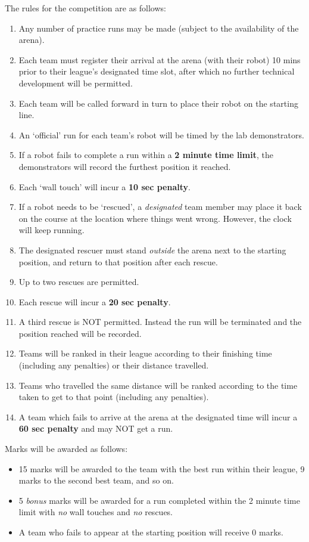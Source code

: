 \documentclass[hidelinks,a4paper,11pt]{article}
\begin{document}
The rules for the competition are as follows:
\begin{enumerate}
	\item Any number of practice runs may be made (subject to the availability of the arena).
	\item Each team must register their arrival at the arena (with their robot) 10 mins prior to their league's designated time slot, after which no further technical development will be permitted.
	\item Each team will be called forward in turn to place their robot on the starting line.
	\item An `official' run for each team's robot will be timed by the lab demonstrators.
	\item If a robot fails to complete a run within a \textbf{2 minute time limit}, the demonstrators will record the furthest position it reached.
	\item Each `wall touch' will incur a \textbf{10 sec penalty}.
	\item If a robot needs to be `rescued', a \emph{designated} team member may place it back on the course at the location where things went wrong.  However, the clock will keep running.
	\item The designated rescuer must stand \emph{outside} the arena next to the starting position, and return to that position after each rescue.
	\item Up to two rescues are permitted.
	\item Each rescue will incur a \textbf{20 sec penalty}.
	\item A third rescue is NOT permitted.  Instead the run will be terminated and the position reached will be recorded.
	\item Teams will be ranked in their league according to their finishing time (including any penalties) or their distance travelled.
	\item Teams who travelled the same distance will be ranked according to the time taken to get to that point (including any penalties).
	\item A team which fails to arrive at the arena at the designated time will incur a \textbf{60 sec penalty} and may NOT get a run.
\end{enumerate}
	
Marks will be awarded as follows:
\begin{itemize}
	\item 15 marks will be awarded to the team with the best run within their league, 9 marks to the second best team, and so on.  
	\item 5 \emph{bonus} marks will be awarded for a run completed within the 2 minute time limit with \emph{no} wall touches and \emph{no} rescues.
	\item A team who fails to appear at the starting position will receive 0 marks.
\end{itemize}
\end{document}
